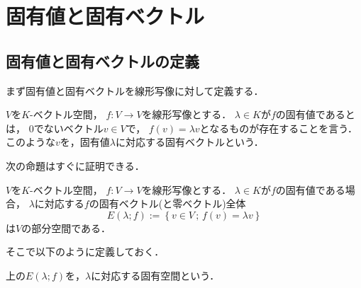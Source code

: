 \section{固有値と固有ベクトル}
\subsection{固有値と固有ベクトルの定義}
まず固有値と固有ベクトルを線形写像に対して定義する．
\begin{dfn}
    $V$を$K$-ベクトル空間，
    $f \colon V \to V$を線形写像とする．
    $\lambda \in K$が$f$の固有値であるとは，
    0でないベクトル$v \in V$で，
    $f(v) = \lambda v$となるものが存在することを言う．
    このような$v$を，固有値$\lambda$に対応する固有ベクトルという．
\end{dfn}
次の命題はすぐに証明できる．
\begin{prop}
    $V$を$K$-ベクトル空間，
    $f \colon V \to V$を線形写像とする．
    $\lambda \in K$が$f$の固有値である場合，
    $\lambda$に対応する$f$の固有ベクトル(と零ベクトル)全体
    \[
        E(\lambda;f) := \left\{
            v \in V \,;\,
            f(v) = \lambda v
        \right\}
    \]
    は$V$の部分空間である．
\end{prop}
そこで以下のように定義しておく．
\begin{dfn}
    上の$E(\lambda;f)$を，$\lambda$に対応する固有空間という．
\end{dfn}


